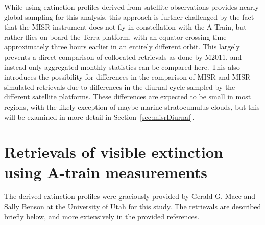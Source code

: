 While using extinction profiles derived from satellite observations
provides nearly global sampling for this analysis, this approach is
further challenged by the fact that the MISR instrument does not fly in
constellation with the A-Train, but rather flies on-board the Terra
platform, with an equator crossing time approximately three hours
earlier in an entirely different orbit. This largely prevents a direct
comparison of collocated retrievals as done by M2011, and instead only
aggregated monthly statistics can be compared here. This also introduces
the possibility for differences in the comparison of MISR and
MISR-simulated retrievals due to differences in the diurnal cycle
sampled by the different satellite platforms. These differences are
expected to be small in most regions, with the likely exception of maybe
marine stratocumulus clouds, but this will be examined in more detail in
Section~\ref{sec:misrDiurnal}.

\section{Retrievals of visible extinction using A-train
measurements}\label{sec:ccRetrievals}

The derived extinction profiles were graciously provided by Gerald G.
Mace and Sally Benson at the University of Utah for this study. The
retrievals are described briefly below, and more extensively in the
provided references.

